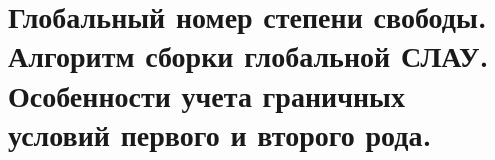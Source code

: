 \documentclass[__main__.tex]{subfiles}
\begin{document}
\section{Глобальный номер степени свободы. Алгоритм сборки глобальной СЛАУ. Особенности учета граничных условий первого и второго рода.}
\end{document}
